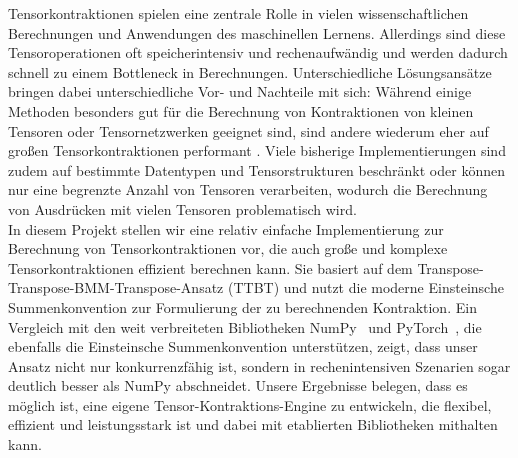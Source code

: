 Tensorkontraktionen spielen eine zentrale Rolle in vielen wissenschaftlichen Berechnungen und Anwendungen des maschinellen Lernens. Allerdings sind diese Tensoroperationen oft speicherintensiv und rechenaufwändig und werden dadurch schnell zu einem Bottleneck in Berechnungen. 
Unterschiedliche Lösungsansätze bringen dabei unterschiedliche Vor- und Nachteile mit sich: Während einige Methoden besonders gut für die Berechnung von Kontraktionen von kleinen Tensoren oder Tensornetzwerken geeignet sind, sind andere wiederum eher auf großen Tensorkontraktionen performant .
Viele bisherige Implementierungen sind zudem auf bestimmte Datentypen und Tensorstrukturen beschränkt oder können nur eine begrenzte Anzahl von Tensoren verarbeiten, wodurch die Berechnung von Ausdrücken mit vielen Tensoren problematisch wird.\\

\noindent In diesem Projekt stellen wir eine relativ einfache Implementierung zur Berechnung von Tensorkontraktionen vor, die auch große und komplexe Tensorkontraktionen effizient berechnen kann. Sie basiert auf dem Transpose-Transpose-BMM-Transpose-Ansatz (TTBT) und nutzt die moderne Einsteinsche Summenkonvention zur Formulierung der zu berechnenden Kontraktion.
Ein Vergleich mit den weit verbreiteten Bibliotheken NumPy~\cite{Numpy} und PyTorch~\cite{PyTorch}, die ebenfalls die Einsteinsche Summenkonvention unterstützen, zeigt, dass unser Ansatz nicht nur konkurrenzfähig ist, sondern in rechenintensiven Szenarien sogar deutlich besser als NumPy abschneidet. Unsere Ergebnisse belegen, dass es möglich ist, eine eigene Tensor-Kontraktions-Engine zu entwickeln, die flexibel, effizient und leistungsstark ist und dabei mit etablierten Bibliotheken mithalten kann.